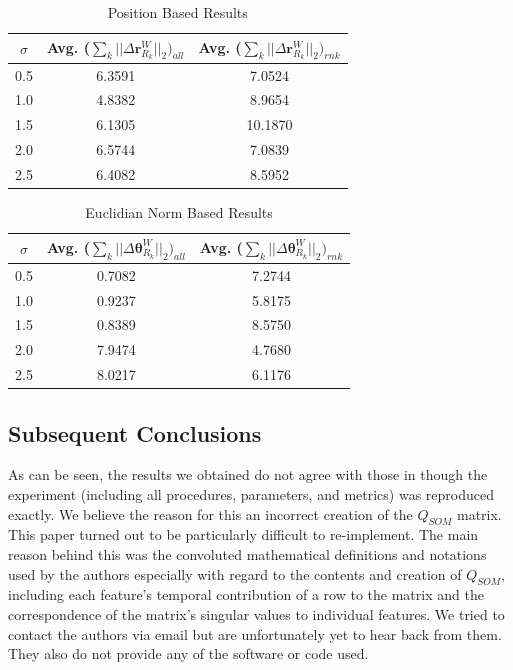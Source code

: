 \documentclass[10pt,twocolumn,letterpaper]{article}
\begin{document}
\begin{table}[h]
\begin{center}
\begin{tabular}{|c|c|c|}
\hline
$\sigma$ & Avg. ($ \sum_k || \Delta \boldsymbol{r}_{R_k}^W ||_2)_{all} $ & Avg. ($ \sum_k || \Delta \boldsymbol{r}_{R_k}^W ||_2)_{rnk} $ \\
\hline
0.5  & 6.3591  &  7.0524\\
\hline
1.0  &  4.8382 &  8.9654\\
\hline
1.5  &  6.1305 &  10.1870\\
\hline
2.0  &  6.5744 &  7.0839\\
\hline
2.5  &  6.4082 &  8.5952\\
\hline
\end{tabular}
\end{center}
\caption{Position Based Results}
\end{table}
\begin{table}[t]
\begin{center}
\begin{tabular}{|c|c|c|}
\hline
$\sigma$ & Avg. ($\sum_k || \Delta \boldsymbol{\theta}_{R_k}^W ||_2)_{all}$ & Avg. ($ \sum_k || \Delta \boldsymbol{\theta}_{R_k}^W ||_2)_{rnk}$\\
\hline
0.5  & 0.7082  &  7.2744\\
\hline
1.0  &  0.9237 &  5.8175\\
\hline
1.5  &  0.8389 &  8.5750\\
\hline
2.0  &  7.9474 &  4.7680\\
\hline
2.5  &  8.0217 &  6.1176\\
\hline
\end{tabular}
\end{center}
\caption{Euclidian Norm Based Results}
\end{table}

\subsection{Subsequent Conclusions}
As can be seen, the results we obtained do not agree with those in \cite{Zhang_2015_CVPR} though the experiment (including all procedures, parameters, and metrics) was reproduced exactly. We believe the reason for this an incorrect creation of the $Q_{SOM}$ matrix. This paper turned out to be particularly difficult to re-implement. The main reason behind this was the convoluted mathematical definitions and notations used by the authors especially with regard to the contents and creation of $Q_{SOM}$, including each feature's temporal contribution of a row to the matrix and the correspondence of the matrix's singular values to individual features. We tried to contact the authors via email but are unfortunately yet to hear back from them. They also do not provide any of the software or code used.
\end{document}
